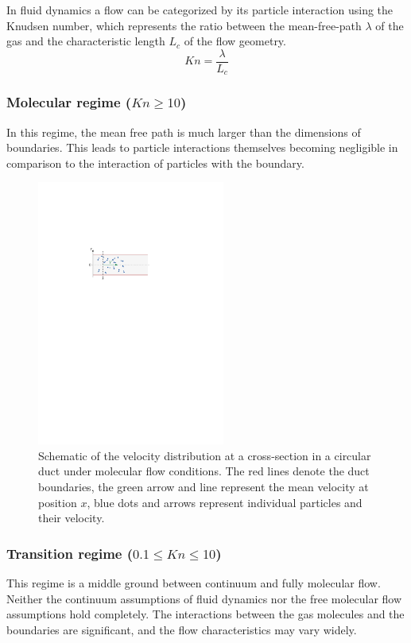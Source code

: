 	In fluid dynamics a flow can be categorized by its particle interaction using the Knudsen number, which represents the ratio between the mean-free-path $\lambda$ of the gas and the characteristic length $L_c$ of the flow geometry.
	\begin{equation}
		Kn=\frac{\lambda}{L_c}
		\label{eq:knudsen-number}
	\end{equation}

\subsubsection*{Molecular regime (\(Kn \geq 10\))}
	In this regime, the mean free path is much larger than the dimensions of boundaries.
	This leads to particle interactions themselves becoming negligible in comparison to the interaction of particles with the boundary.
	\begin{figure}[H]
	    \centering
	    \includegraphics[width=0.55\textwidth]{src/02_foundations/fig_molecular-regime.pdf}
		\caption{
			Schematic of the velocity distribution at a cross-section in a circular duct under molecular flow conditions.
			The red lines denote the duct boundaries, the green arrow and line represent the mean velocity at position $x$, blue dots and arrows represent individual particles and their velocity.
		}
		\label{fig:molecular-flow}
	\end{figure}

\subsubsection*{Transition regime (\(0.1 \leq Kn \leq 10\))}
	This regime is a middle ground between continuum and fully molecular flow.
	Neither the continuum assumptions of fluid dynamics nor the free molecular flow assumptions hold completely.
	The interactions between the gas molecules and the boundaries are significant, and the flow characteristics may vary widely.

